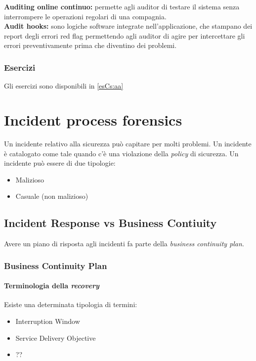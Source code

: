 \textbf{Auditing online continuo:} permette agli auditor di testare il sistema senza
interrompere le operazioni regolari di una compagnia.\\
\newline
\textbf{Audit hooks:} sono logiche software integrate nell'applicazione, che stampano 
dei report degli errori red flag permettendo agli auditor di agire per intercettare gli 
errori preventivamente prima che diventino dei problemi.

\section{Esercizi}

Gli esercizi sono disponibili in \ref{esCs:aa}

\part{Incident process forensics}

Un incidente relativo alla sicurezza può capitare per molti problemi. Un
incidente è catalogato come tale quando c'è una violazione della \textit{policy}
di sicurezza. Un incidente può essere di due tipologie:
\begin{itemize}
\item Malizioso
\item Casuale (non malizioso)
\end{itemize}

\chapter{Incident Response vs Business Contiuity}
\label{IRBC}

Avere un piano di risposta agli incidenti fa parte della \textit{business
continuity plan}.

\section{Business Continuity Plan}

\subsection{Terminologia della \textit{recovery}}
Esiste una determinata tipologia di termini:
\begin{itemize}
\item Interruption Window
\item Service Delivery Objective
\item ?? 
\end{itemize}

